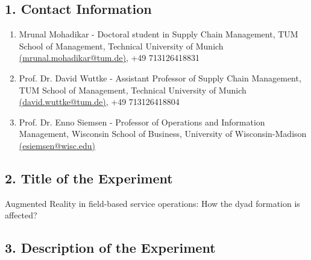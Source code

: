 \documentclass[A4,11pt]{article}
\begin{document}

\subsection*{1. Contact Information}
\begin{enumerate}
\item Mrunal Mohadikar - Doctoral student in Supply Chain Management, TUM School of Management, Technical University of Munich\\ \href{mailto:mrunal.mohadikar@tum.de}{(mrunal.mohadikar@tum.de)}, +49 713126418831
\item Prof. Dr. David Wuttke - Assistant Professor of Supply Chain Management, TUM School of Management, Technical University of Munich\\ \href{mailto:david.wuttke@tum.de}{(david.wuttke@tum.de)}, +49 713126418804
\item Prof. Dr. Enno Siemsen - Professor of Operations and Information Management, Wisconsin School of Business, University of Wisconsin-Madison\\ 
\href{mailto:esiemsen@wisc.edu}{(esiemsen@wisc.edu)}
\end{enumerate}

\subsection*{2. Title of the Experiment} 
Augmented Reality in field-based service operations: How the dyad formation is affected?

\subsection*{3. Description of the Experiment}
\end{document}
